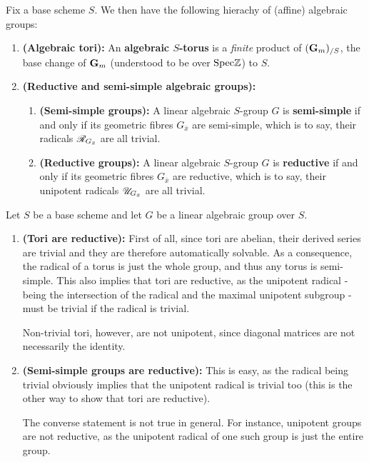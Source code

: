             \begin{definition} \label{def: tori_and_reductive_groups}
                Fix a base scheme $S$. We then have the following hierachy of (affine) algebraic groups:
                \begin{enumerate}
                    \item \textbf{(Algebraic tori):} An \textbf{algebraic $S$-torus} is a \textit{finite} product of $(\mathbf{G}_m)_{/S}$, the base change of $\mathbf{G}_m$ (understood to be over $\mathrm{Spec} \mathbb{Z}$) to $S$.
                    \item \textbf{(Reductive and semi-simple algebraic groups):} 
                        \begin{enumerate}
                            \item \textbf{(Semi-simple groups):} A linear algebraic $S$-group $G$ is \textbf{semi-simple} if and only if its geometric fibres $G_{\bar{x}}$ are semi-simple, which is to say, their radicals $\mathscr{R}_{G_{\bar{x}}}$ are all trivial. 
                            \item \textbf{(Reductive groups):} A linear algebraic $S$-group $G$ is \textbf{reductive} if and only if its geometric fibres $G_{\bar{x}}$ are reductive, which is to say, their unipotent radicals $\mathscr{U}_{G_{\bar{x}}}$ are all trivial.
                        \end{enumerate}
                \end{enumerate}
            \end{definition}
            \begin{remark} \label{remark: tori_and_reductive_groups}
                Let $S$ be a base scheme and let $G$ be a linear algebraic group over $S$.
                \begin{enumerate}
                    \item \textbf{(Tori are reductive):} First of all, since tori are abelian, their derived series are trivial and they are therefore automatically solvable. As a consequence, the radical of a torus is just the whole group, and thus any torus is semi-simple. This also implies that tori are reductive, as the unipotent radical - being the intersection of the radical and the maximal unipotent subgroup - must be trivial if the radical is trivial.
                    
                    Non-trivial tori, however, are not unipotent, since diagonal matrices are not necessarily the identity.
                    \item \textbf{(Semi-simple groups are reductive):} This is easy, as the radical being trivial obviously implies that the unipotent radical is trivial too (this is the other way to show that tori are reductive). 
                    
                    The converse statement is not true in general. For instance, unipotent groups are not reductive, as the unipotent radical of one such group is just the entire group.
                \end{enumerate}
            \end{remark}
                    
